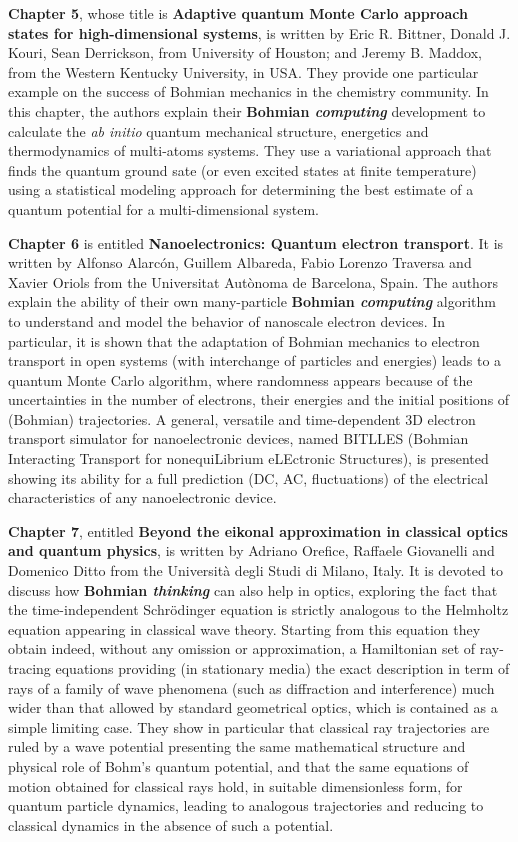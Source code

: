 \documentclass[onecolumn,nofootinbib, secnumarabic, amsmath, nobibnotes,11pt,aps,pra]{revtex4-1}
\begin{document}
\textbf{Chapter 5}, whose title is \textbf{Adaptive quantum Monte Carlo approach states for high-dimensional systems}, is written by Eric R. Bittner, Donald J. Kouri, Sean Derrickson, from University of Houston; and Jeremy B. Maddox, from the Western Kentucky University, in USA. They provide one particular example on the success of Bohmian mechanics in the chemistry community. In this chapter, the authors explain their \textbf{Bohmian \emph{computing}} development to calculate the \emph{ab initio} quantum mechanical structure, energetics and thermodynamics of multi-atoms systems. They use a variational approach that finds the quantum ground sate (or even excited states at finite temperature) using a statistical modeling approach for determining the best estimate of a quantum potential for a multi-dimensional system.

\textbf{Chapter 6} is entitled \textbf{Nanoelectronics: Quantum electron transport}. It is written by Alfonso Alarc\'on, Guillem Albareda, Fabio Lorenzo Traversa and Xavier Oriols from the Universitat Aut\`{o}noma de Barcelona, Spain. The authors explain the ability of their own many-particle \textbf{Bohmian \emph{computing}} algorithm to understand and model the behavior of nanoscale electron devices. In particular, it is shown that the adaptation of Bohmian mechanics to electron transport in open systems (with interchange of particles and energies) leads to a quantum Monte Carlo algorithm, where randomness appears because of the uncertainties in the number of electrons, their energies and the initial positions of (Bohmian) trajectories. A general, versatile and time-dependent 3D electron transport simulator for nanoelectronic devices, named BITLLES (Bohmian Interacting Transport for nonequiLibrium eLEctronic Structures), is presented showing its ability for a full prediction (DC, AC, fluctuations) of the electrical characteristics of any nanoelectronic device.

\textbf{Chapter 7}, entitled \textbf{Beyond the eikonal approximation in classical optics and quantum physics}, is written by Adriano Orefice, Raffaele Giovanelli and Domenico Ditto from the Universit\`{a} degli Studi di Milano, Italy. It is devoted to discuss how \textbf{Bohmian \emph{thinking}} can also help in optics, exploring the fact that the time-independent Schr\"{o}dinger equation is strictly analogous to the Helmholtz equation appearing in classical wave theory. Starting from this equation they obtain indeed, without any omission or approximation, a Hamiltonian set of ray-tracing equations providing (in stationary media) the exact description in term of rays of a family of wave phenomena (such as diffraction and interference) much wider than that allowed by standard geometrical optics, which is contained as a simple limiting case. They show in particular that classical ray trajectories are ruled by a wave potential presenting the same mathematical structure and physical role of Bohm's quantum potential, and that the same equations of motion obtained for classical rays hold, in suitable dimensionless form, for quantum particle dynamics, leading to analogous trajectories and reducing to classical dynamics in the absence of such a potential.
\end{document}
